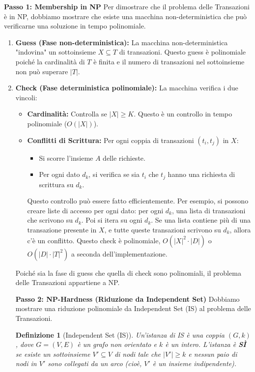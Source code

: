 \documentclass[a4paper]{article}
\newtheorem{definition}{Definizione}
\begin{document}
\begin{itemize}
\textbf{Passo 1: Membership in NP}
Per dimostrare che il problema delle Transazioni è in NP, dobbiamo mostrare che esiste una macchina non-deterministica che può verificarne una soluzione in tempo polinomiale.
\begin{enumerate}
    \item \textbf{Guess (Fase non-deterministica):} La macchina non-deterministica "indovina" un sottoinsieme $X \subseteq T$ di transazioni. Questo guess è polinomiale poiché la cardinalità di $T$ è finita e il numero di transazioni nel sottoinsieme non può superare $|T|$.
    \item \textbf{Check (Fase deterministica polinomiale):} La macchina verifica i due vincoli:
    \begin{itemize}
        \item \textbf{Cardinalità:} Controlla se $|X| \ge K$. Questo è un controllo in tempo polinomiale ($O(|X|)$).
        \item \textbf{Conflitti di Scrittura:} Per ogni coppia di transazioni $(t_i, t_j)$ in $X$:
        \begin{itemize}
            \item Si scorre l'insieme $A$ delle richieste.
            \item Per ogni dato $d_k$, si verifica se sia $t_i$ che $t_j$ hanno una richiesta di scrittura su $d_k$.
        \end{itemize}
        Questo controllo può essere fatto efficientemente. Per esempio, si possono creare liste di accesso per ogni dato: per ogni $d_k$, una lista di transazioni che scrivono su $d_k$. Poi si itera su ogni $d_k$. Se una lista contiene più di una transazione presente in $X$, e tutte queste transazioni scrivono su $d_k$, allora c'è un conflitto. Questo check è polinomiale, $O(|X|^2 \cdot |D|)$ o $O(|D| \cdot |T|^2)$ a seconda dell'implementazione.
    \end{itemize}
    Poiché sia la fase di guess che quella di check sono polinomiali, il problema delle Transazioni appartiene a NP.

\textbf{Passo 2: NP-Hardness (Riduzione da Independent Set)}
Dobbiamo mostrare una riduzione polinomiale da Independent Set (IS) al problema delle Transazioni.
\begin{definition}[Independent Set (IS)]
Un'istanza di IS è una coppia $(G, k)$, dove $G=(V, E)$ è un grafo non orientato e $k$ è un intero. L'istanza è \textbf{SÌ} se esiste un sottoinsieme $V' \subseteq V$ di nodi tale che $|V'| \ge k$ e nessun paio di nodi in $V'$ sono collegati da un arco (cioè, $V'$ è un insieme indipendente).
\end{definition}


\end{enumerate}
\end{itemize}
\end{document}
